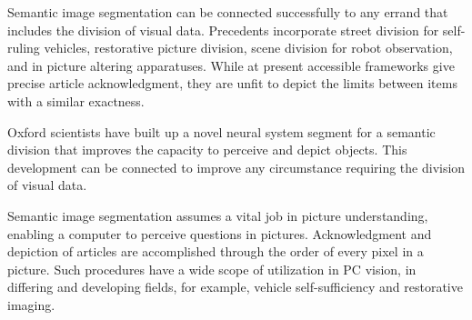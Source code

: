 Semantic image segmentation can be connected successfully to any errand that includes the division of visual data. Precedents incorporate street division for self-ruling vehicles, restorative picture division, scene division for robot observation, and in picture altering apparatuses. While at present accessible frameworks give precise article acknowledgment, they are unfit to depict the limits between items with a similar exactness. 

Oxford scientists have built up a novel neural system segment for a semantic division that improves the capacity to perceive and depict objects. This development can be connected to improve any circumstance requiring the division of visual data. 

Semantic image segmentation assumes a vital job in picture understanding, enabling a computer to perceive questions in pictures. Acknowledgment and depiction of articles are accomplished through the order of every pixel in a picture. Such procedures have a wide scope of utilization in PC vision, in differing and developing fields, for example, vehicle self-sufficiency and restorative imaging. 

